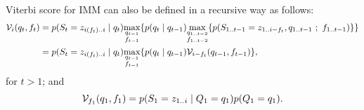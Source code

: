 Viterbi score for IMM can also be defined in a recursive way as follows:
\begin{equation*}
  \begin{split}
    \mathcal{V}_{i}(q_t,f_t)
    &= p(S_t=z_{i(f_t)..i} \;|\; q_t)
      \underset{\substack{q_{t-1}\\f_{t-1}}}{\max}
      \{
        p(q_t \;|\; q_{t-1})
        \underset{\substack{q_{1..t-2}\\f_{1..t-2}}}{\max}
        \{
          p(S_{1..t-1}=z_{1..i-f_t}, q_{1..t-1} ~;~ f_{1..t-1})
        \}
      \}\\
    &= p(S_t=z_{i(f_t)..i} \;|\; q_t)
      \underset{\substack{q_{t-1}\\f_{t-1}}}{\max}
      \{
        p(q_t \;|\; q_{t-1}) \mathcal{V}_{i-f_t}(q_{t-1},f_{t-1})
      \},
  \end{split}
\end{equation*}
for $t>1$; and
\begin{equation*}
  \mathcal{V}_{f_1}(q_1,f_1) = p(S_1=z_{1..i} \;|\; Q_1=q_1) p(Q_1=q_1).
\end{equation*}
